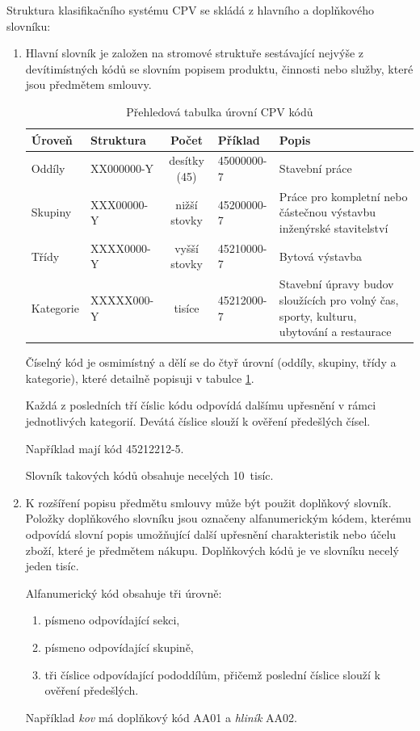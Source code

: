 \documentclass[thesis=M,czech]{FITthesis}[2019/12/23]
\begin{document}
Struktura klasifikačního systému CPV se skládá z hlavního a doplňkového slovníku\cite{CPV}:
\begin{enumerate}
    \item Hlavní slovník je založen na stromové struktuře sestávající nejvýše z devítimístných kódů se slovním popisem produktu, činnosti nebo služby, které jsou předmětem smlouvy.
    \begin{table}[h!]
        \begin{tabularx}{\textwidth}{|l|l|c|l|X|}
                 \hline
                  Úroveň & Struktura & Počet & Příklad & Popis \\\hline
                  \hline
                  Oddíly & \small{XX000000-Y} & desítky (45) & \small{45000000-7} & \scriptsize{Stavební práce}\\\hline
                  Skupiny & \small{XXX00000-Y} & nižší stovky & \small{45200000-7} & \scriptsize{Práce pro kompletní nebo částečnou výstavbu inženýrské stavitelství}\\\hline
                  Třídy & \small{XXXX0000-Y} & vyšší stovky & \small{45210000-7} & \scriptsize{Bytová výstavba}\\\hline
                  Kategorie & \small{XXXXX000-Y} & tisíce & \small{45212000-7} & \scriptsize{Stavební úpravy budov sloužících pro volný čas, sporty, kulturu, ubytování a restaurace}\\\hline
        \end{tabularx}
    \caption{Přehledová tabulka úrovní CPV kódů}
    \label{table:CPV}
    \end{table}
    
    Číselný kód je osmimístný a dělí se do čtyř úrovní (oddíly, skupiny, třídy a kategorie), které detailně popisuji v tabulce \ref{table:CPV}.
    
    Každá z posledních tří číslic kódu odpovídá dalšímu upřesnění v rámci jednotlivých kategorií. Devátá číslice slouží k ověření předešlých čísel.
    
    Například  mají kód 45212212-5.
    
    Slovník takových kódů obsahuje necelých 10~tisíc.
    
    \item K rozšíření popisu předmětu smlouvy může být použit doplňkový slovník. Položky doplňkového slovníku jsou označeny alfanumerickým kódem, kterému odpovídá slovní popis umožňující další upřesnění charakteristik nebo účelu zboží, které je předmětem nákupu. Doplňkových kódů je ve slovníku necelý jeden tisíc.
    
    Alfanumerický kód obsahuje tři úrovně:
    \begin{enumerate}
        \item písmeno odpovídající sekci,
        \item písmeno odpovídající skupině,
        \item tři číslice odpovídající pododdílům, přičemž poslední číslice slouží k ověření předešlých.
    \end{enumerate}
    
    Například \textit{kov} má doplňkový kód AA01 a \textit{hliník} AA02.
\end{enumerate}
\end{document}
